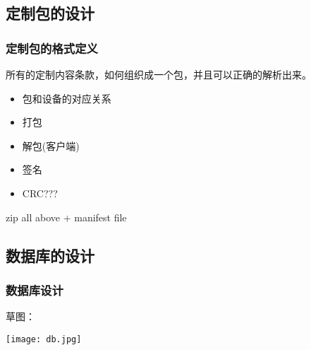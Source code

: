 \documentclass{beamer}
\begin{document}
\subsection{定制包的设计}
\begin{frame}
\frametitle{定制包的格式定义}
所有的定制内容条款，如何组织成一个包，并且可以正确的解析出来。

\begin{itemize}
 \item 包和设备的对应关系
 \item 打包
 \item 解包(客户端)
 \item 签名
 \item CRC???
\end{itemize}

zip all above + manifest file

\end{frame}

\subsection{数据库的设计}
\begin{frame}

\frametitle{数据库设计}
草图：

\vspace{0.2cm}
\texttt{[image: db.jpg]}

\end{frame}
\end{document}
